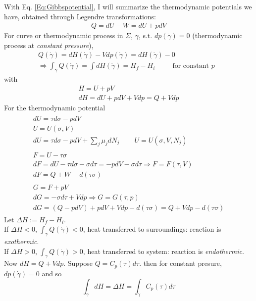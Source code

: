 \documentclass[10pt]{amsart}
\begin{document}
\begin{multicols*}{2}
With Eq. \ref{Eq:Gibbspotential}, I will summarize the thermodynamic potentials we have, obtained through Legendre transformations:
\[
\begin{gathered}
  Q = dU - W = dU + p dV
\end{gathered}
\]
For curve or thermodynamic process in $\Sigma$, $\gamma$, s.t. $dp(\dot{\gamma})=0$ (thermodynamic process at \emph{constant pressure}),
\[
\begin{gathered}
  Q(\dot{\gamma}) = dH(\dot{\gamma}) -Vdp(\dot{\gamma}) = dH(\dot{\gamma}) - 0 \\
  \Longrightarrow \int_{\gamma} Q(\dot{\gamma}) = \int dH(\dot{\gamma}) = H_f - H_i \qquad \, \text{ for constant $p$ }
\end{gathered}
\]
with 
\[
\begin{gathered}
  H = U + pV \\
  dH = dU + pdV + Vdp = Q + Vdp
\end{gathered}
\]
For the thermodynamic potential
\[
\begin{gathered}
  \begin{gathered}
    dU = \tau d\sigma - pdV \\ 
    \boxed{ U = U(\sigma, V) } \\
    dU = \tau d\sigma - pdV + \sum_j \mu_j dN_j \qquad \, U = U(\sigma, V,N_j)
\end{gathered} \\
  \begin{gathered}
    F = U -\tau \sigma  \\
    dF = dU- \tau d\sigma - \sigma d\tau = -pdV - \sigma d\tau  \Longrightarrow \boxed{ F = F(\tau,V) } \\  
    dF = Q + W - d(\tau \sigma ) 
\end{gathered} \\
  \begin{gathered}
    G = F + pV \\ 
    dG = -\sigma d\tau + Vdp \Longrightarrow \boxed{ G = G(\tau,p) } \\
    dG = (Q - pdV ) + pdV + Vdp - d(\tau \sigma ) = Q + Vdp - d(\tau \sigma)
\end{gathered}
\end{gathered}
\]
Let $\Delta H := H_f - H_i$.  \\
If $\Delta H < 0$, $\int_{\gamma} Q(\dot{\gamma}) <0$, heat transferred to surroundings: reaction is \emph{exothermic}.  \\
If $\Delta H > 0$, $\int_{\gamma} Q(\dot{\gamma}) >0$, heat transferred to system: reaction is \emph{endothermic}.  
Now $dH = Q + Vdp$.  Suppose $Q = C_p(\tau) d\tau$.  then for constant presure, $dp(\dot{\gamma})=0$ and so 
\[
\int_{\gamma} dH = \Delta H = \int_{\gamma} C_p(\tau) d\tau
\]


\end{multicols*}
\end{document}
